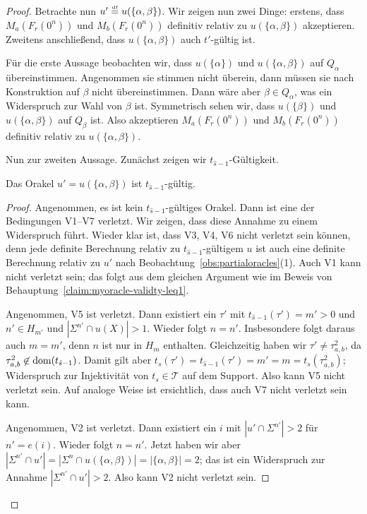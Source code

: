 \begin{proof}
Betrachte nun $u'\stackrel{\text{\smash{\tiny df}}}{=} u(\{\alpha, \beta\})$. Wir zeigen nun zwei Dinge: erstens, dass $M_a(F_r(0^n))$ und $M_b(F_r(0^n))$ definitiv relativ zu $u(\{\alpha, \beta\})$ akzeptieren.
Zweitens anschließend, dass $u(\{\alpha,\beta\})$ auch $t'$-gültig ist.

Für die erste Aussage beobachten wir, dass $u(\{\alpha\})$ und $u(\{\alpha, \beta\})$ auf $Q_\alpha$ übereinstimmen. Angenommen sie stimmen nicht überein, dann müssen sie nach Konstruktion auf $\beta$ nicht übereinstimmen. Dann wäre aber $\beta\in Q_\alpha$, was ein Widerspruch zur Wahl von $\beta$ ist.
Symmetrisch sehen wir, dass $u(\{\beta\})$ und $u(\{\alpha, \beta\})$ auf $Q_\beta$ ist.
Also akzeptieren $M_a(F_r(0^n))$ und $M_b(F_r(0^n))$ definitiv relativ zu $u(\{\alpha, \beta\})$.

Nun zur zweiten Aussage. Zunächst zeigen wir $t_{\hat{s}-1}$-Gültigkeit.
\begin{claim}\label{claim:myoracle-validty-eq2}
    Das Orakel $u'=u(\{\alpha, \beta\})$ ist $t_{\hat{s}-1}$-gültig.
\end{claim}
\begin{proof}
    Angenommen, es ist kein $t_{\hat{s}-1}$-gültiges Orakel. Dann ist eine der Bedingungen V1–V7 verletzt. Wir zeigen, dass diese Annahme zu einem Widerspruch führt.
    Wieder klar ist, dass V3, V4, V6 nicht verletzt sein können, denn jede definite Berechnung relativ zu $t_{\hat{s}-1}$-gültigem $u$ ist auch eine definite Berechnung relativ zu $u'$ nach Beobachtung~\ref{obs:partialoracles}(1).
    Auch V1 kann nicht verletzt sein; das folgt aus dem gleichen Argument wie im Beweis von Behauptung~\ref{claim:myoracle-validty-leq1}.

    Angenommen, V5 ist verletzt. Dann existiert ein $\tau'$ mit $t_{\hat{s}-1}(\tau')=m'>0$ und $n'\in H_{m'}$ und $|\Sigma^{n'}\cap u(X)|>1$. 
    Wieder folgt $n=n'$.
    Insbesondere folgt daraus auch $m=m'$, denn $n$ ist nur in $H_m$ enthalten.
    Gleichzeitig haben wir $\tau'\neq \tau^2_{a,b}$, da $\tau^2_{a,b}\not\in\operatorname{dom}(t_{\hat{s}-1})$.
    Damit gilt aber $t_s(\tau')=t_{\hat{s}-1}(\tau')=m'=m=t_s(\tau^2_{a,b})$; Widerspruch zur Injektivität von $t_s\in\mathcal T$ auf dem Support.
    Also kann V5 nicht verletzt sein. 
    Auf analoge Weise ist ersichtlich, dass auch V7 nicht verletzt sein kann.

    Angenommen, V2 ist verletzt. Dann existiert ein $i$ mit $|u'\cap\Sigma^{n'}|>2$ für $n'=e(i)$.
    Wieder folgt $n=n'$.
    Jetzt haben wir aber $|\Sigma^{n'}\cap u'|=|\Sigma^n\cap u(\{\alpha, \beta\})| = |\{\alpha,\beta\}|=2$; das ist ein Widerspruch zur Annahme $|\Sigma^{n'}\cap u'|>2$. Also kann V2 nicht verletzt sein. 


\end{proof}
\end{proof}
